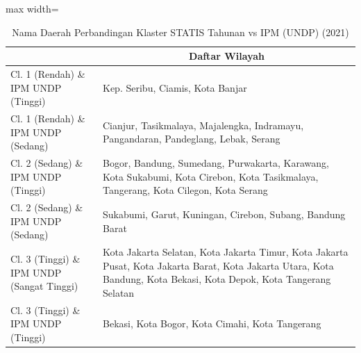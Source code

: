 \begin{table}[H]
\centering
\caption{Nama Daerah Perbandingan Klaster STATIS Tahunan vs IPM (UNDP) (2021)} \label{tab:app2statis_ipm_name_2021}
\begin{adjustbox}{max width=\textwidth}
\begin{tabular}{|>{\centering\arraybackslash}p{4cm}|p{10cm}|}
\hline
\multicolumn{1}{|c|}{\textbf{Kategori}} & \multicolumn{1}{c|}{\textbf{Daftar Wilayah}} \\
\hline
Cl. 1 (Rendah) \& IPM UNDP (Tinggi) & Kep. Seribu, Ciamis, Kota Banjar \\
\hline
Cl. 1 (Rendah) \& IPM UNDP (Sedang) & Cianjur, Tasikmalaya, Majalengka, Indramayu, Pangandaran, Pandeglang, Lebak, Serang \\
\hline
Cl. 2 (Sedang) \& IPM UNDP (Tinggi) & Bogor, Bandung, Sumedang, Purwakarta, Karawang, Kota Sukabumi, Kota Cirebon, Kota Tasikmalaya, Tangerang, Kota Cilegon, Kota Serang \\
\hline
Cl. 2 (Sedang) \& IPM UNDP (Sedang) & Sukabumi, Garut, Kuningan, Cirebon, Subang, Bandung Barat \\
\hline
Cl. 3 (Tinggi) \& IPM UNDP (Sangat Tinggi) & Kota Jakarta Selatan, Kota Jakarta Timur, Kota Jakarta Pusat, Kota Jakarta Barat, Kota Jakarta Utara, Kota Bandung, Kota Bekasi, Kota Depok, Kota Tangerang Selatan \\
\hline
Cl. 3 (Tinggi) \& IPM UNDP (Tinggi) & Bekasi, Kota Bogor, Kota Cimahi, Kota Tangerang \\
\hline
\end{tabular}
\end{adjustbox}
\end{table}
